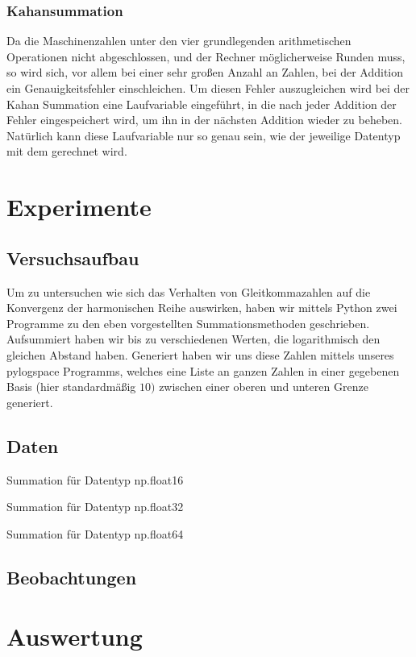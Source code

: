 \documentclass{scrartcl}
\begin{document}
\subsubsection{Kahansummation}
Da die Maschinenzahlen unter den vier grundlegenden arithmetischen Operationen nicht abgeschlossen, und der Rechner
möglicherweise Runden muss, so wird sich, vor allem bei einer sehr großen Anzahl an Zahlen, bei der Addition 
ein Genauigkeitsfehler einschleichen. Um diesen Fehler auszugleichen wird bei der Kahan Summation eine Laufvariable eingeführt, 
in die nach jeder Addition der Fehler eingespeichert wird, um ihn in der nächsten Addition wieder zu beheben. Natürlich kann diese
Laufvariable nur so genau sein, wie der jeweilige Datentyp mit dem gerechnet wird.

\section{Experimente}
\subsection{Versuchsaufbau}
Um zu untersuchen wie sich das Verhalten von Gleitkommazahlen auf die Konvergenz der harmonischen Reihe auswirken, haben wir
mittels Python zwei Programme zu den eben vorgestellten Summationsmethoden geschrieben. Aufsummiert haben wir bis zu verschiedenen Werten, 
die logarithmisch den gleichen Abstand haben. Generiert haben wir uns diese Zahlen mittels unseres pylogspace Programms, welches eine Liste an ganzen
Zahlen in einer gegebenen Basis (hier standardmäßig \(10)\) zwischen einer oberen und unteren Grenze generiert.

\subsection{Daten}

Summation für Datentyp np.float16


Summation für Datentyp np.float32


Summation für Datentyp np.float64

\subsection{Beobachtungen}

\section{Auswertung}
\end{document}
